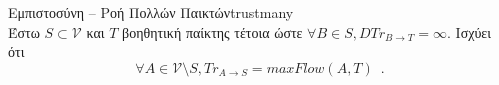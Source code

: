 {}
\begin{theoremgr}{Εμπιστοσύνη -- Ροή Πολλών Παικτών}{trustmany} \ \\
  Έστω $S \subset \mathcal{V}$ και $T$ βοηθητική παίκτης τέτοια ώστε $\forall B \in S, DTr_{B \rightarrow T} = \infty$.
  Ισχύει ότι
  \begin{equation*}
    \forall A \in \mathcal{V} \setminus S, Tr_{A \rightarrow S} = maxFlow\left(A, T\right) \enspace.
  \end{equation*}
\end{theoremgr}
